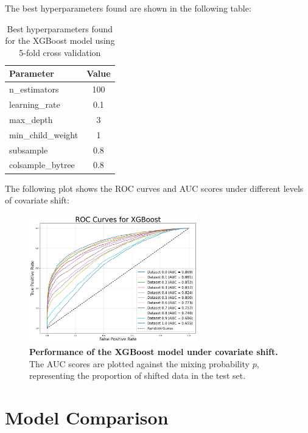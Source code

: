The best hyperparameters found are shown in the following table:

\vspace{0.3em}

\begin{table}[H]
	\centering
	\begin{tabular}{l|c}
	\toprule
	\textbf{Parameter} & \textbf{Value} \\
	\midrule
	n\_estimators & 100 \\
	learning\_rate & 0.1 \\
	max\_depth & 3 \\
	min\_child\_weight & 1 \\
	subsample & 0.8 \\
	colsample\_bytree & 0.8 \\
	\bottomrule
	\end{tabular}
	\caption{Best hyperparameters found for the XGBoost model using 5-fold cross validation}
\end{table}

The following plot shows the ROC curves and AUC scores under different levels of covariate shift:

\vspace{0.5em}

\begin{figure}[H]
	\centering
	\includegraphics[width=0.65\textwidth]{assets/xgb_auc.png}
	\caption{\textbf{Performance of the XGBoost model under covariate shift.} \newline The AUC scores are plotted against the mixing probability $p$, representing the proportion of shifted data in the test set.}
	\label{fig:xgboost-perf}
\end{figure}

\section{Model Comparison}

